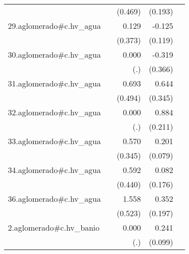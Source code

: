 {\begin{longtable}{l*{4}{D{.}{.}{-1}}}
            &                     &     (0.469)         &     (0.193)         &                     \\
\addlinespace
29.aglomerado#c.hv\_agua&                     &       0.129         &      -0.125         &                     \\
            &                     &     (0.373)         &     (0.119)         &                     \\
\addlinespace
30.aglomerado#c.hv\_agua&                     &       0.000         &      -0.319         &                     \\
            &                     &         (.)         &     (0.366)         &                     \\
\addlinespace
31.aglomerado#c.hv\_agua&                     &       0.693         &       0.644         &                     \\
            &                     &     (0.494)         &     (0.345)         &                     \\
\addlinespace
32.aglomerado#c.hv\_agua&                     &       0.000         &       0.884\sym{***}&                     \\
            &                     &         (.)         &     (0.211)         &                     \\
\addlinespace
33.aglomerado#c.hv\_agua&                     &       0.570         &       0.201\sym{*}  &                     \\
            &                     &     (0.345)         &     (0.079)         &                     \\
\addlinespace
34.aglomerado#c.hv\_agua&                     &       0.592         &       0.082         &                     \\
            &                     &     (0.440)         &     (0.176)         &                     \\
\addlinespace
36.aglomerado#c.hv\_agua&                     &       1.558\sym{**} &       0.352         &                     \\
            &                     &     (0.523)         &     (0.197)         &                     \\
\addlinespace
2.aglomerado#c.hv\_banio&                     &       0.000         &       0.241\sym{*}  &                     \\
            &                     &         (.)         &     (0.099)         &                     \\

\end{longtable}}
